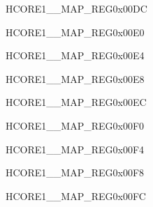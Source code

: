 \begin{register}{H}{CORE1\_\_MAP\_REG}{0x00DC}\label{regdesc:CORE1SYSTIMERTARGET2INTMAPREG}
\end{register}\vspace{-3em}


\begin{register}{H}{CORE1\_\_MAP\_REG}{0x00E0}\label{regdesc:CORE1AHBPDMAINCH0INTMAPREG}
\end{register}\vspace{-3em}


\begin{register}{H}{CORE1\_\_MAP\_REG}{0x00E4}\label{regdesc:CORE1AHBPDMAINCH1INTMAPREG}
\end{register}\vspace{-3em}


\begin{register}{H}{CORE1\_\_MAP\_REG}{0x00E8}\label{regdesc:CORE1AHBPDMAINCH2INTMAPREG}
\end{register}\vspace{-3em}


\begin{register}{H}{CORE1\_\_MAP\_REG}{0x00EC}\label{regdesc:CORE1AHBPDMAOUTCH0INTMAPREG}
\end{register}\vspace{-3em}


\begin{register}{H}{CORE1\_\_MAP\_REG}{0x00F0}\label{regdesc:CORE1AHBPDMAOUTCH1INTMAPREG}
\end{register}\vspace{-3em}


\begin{register}{H}{CORE1\_\_MAP\_REG}{0x00F4}\label{regdesc:CORE1AHBPDMAOUTCH2INTMAPREG}
\end{register}\vspace{-3em}


\begin{register}{H}{CORE1\_\_MAP\_REG}{0x00F8}\label{regdesc:CORE1AXIPDMAINCH0INTMAPREG}
\end{register}\vspace{-3em}


\begin{register}{H}{CORE1\_\_MAP\_REG}{0x00FC}\label{regdesc:CORE1AXIPDMAINCH1INTMAPREG}
\end{register}\vspace{-3em}


